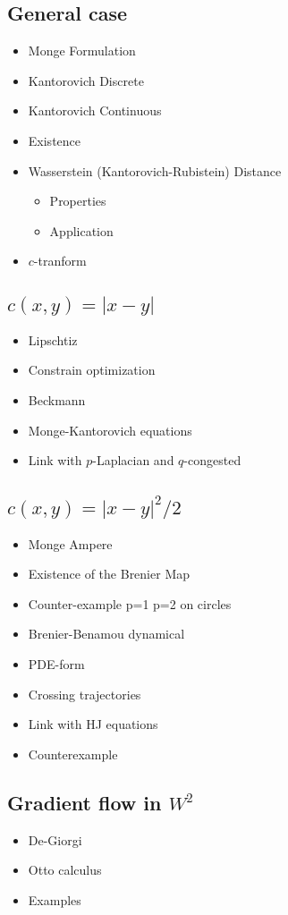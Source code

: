 \documentclass{article}
\begin{document}
\subsection{General case}
\begin{itemize}
\item Monge Formulation
\item Kantorovich Discrete
\item Kantorovich Continuous
\item Existence
\item Wasserstein (Kantorovich-Rubistein) Distance
  \begin{itemize}
  \item Properties
  \item Application
  \end{itemize}
\item $c$-tranform
\end{itemize}

\subsection{$c(x,y)=|x-y|$}
\begin{itemize}
\item Lipschtiz
\item Constrain optimization
\item Beckmann
\item Monge-Kantorovich equations
\item Link with $p$-Laplacian and $q$-congested
\end{itemize}


\subsection{$c(x,y)=|x-y|^2/2$}
\begin{itemize}
\item Monge Ampere
\item Existence of the Brenier Map
\item Counter-example p=1 p=2 on circles
\item Brenier-Benamou dynamical
\item PDE-form
  \item Crossing trajectories
  \item Link with HJ equations
    \item Counterexample \cite{SANTAMBROGIO2016152} 
\end{itemize}

\subsection{Gradient flow in $W^2$}
\begin{itemize}
\item De-Giorgi
\item Otto calculus
\item Examples
\end{itemize}
\end{document}
